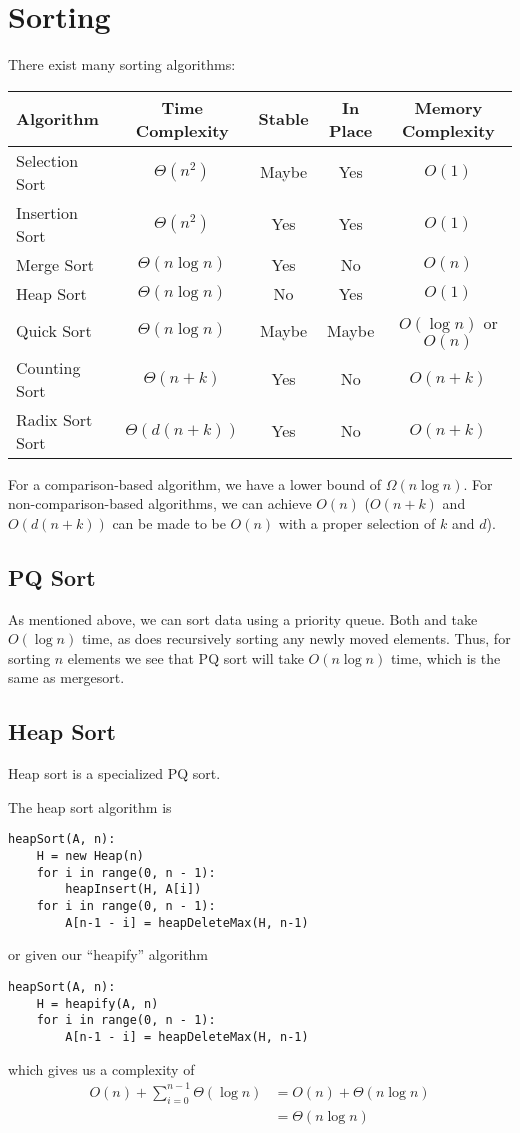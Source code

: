 \documentclass[12pt]{article}
\begin{document}
\section{Sorting}
There exist many sorting algorithms:
\begin{table}[ht]
\centering
  \begin{tabular}{|l|c|c|c|c|}
  \hline
  Algorithm & Time Complexity & Stable & In Place & Memory Complexity \\
  \hline
  \hline
  Selection Sort & $\Theta(n^2)$ & Maybe & Yes & $O(1)$ \\
  Insertion Sort & $\Theta(n^2)$ & Yes & Yes & $O(1)$ \\
  Merge Sort & $\Theta(n\log n)$ & Yes & No & $O(n)$ \\
  Heap Sort & $\Theta(n\log n)$ & No & Yes & $O(1)$ \\
  Quick Sort & $\Theta(n\log n)$ & Maybe & Maybe & $O(\log n)$ or $O(n)$ \\
  Counting Sort & $\Theta(n+k)$ & Yes & No & $O(n+k)$ \\
  Radix Sort Sort & $\Theta(d(n+k))$ & Yes & No & $O(n+k)$ \\
  \hline
  \end{tabular}
\end{table}

For a comparison-based algorithm, we have a lower bound of $\Omega(n\log n)$. For non-comparison-based algorithms, we can achieve $O(n)$ ($O(n+k)$ and $O(d(n+k))$ can be made to be $O(n)$ with a proper selection of $k$ and $d$).

\subsection{PQ Sort}
As mentioned above, we can sort data using a priority queue. Both  and  take $O(\log n)$ time, as does recursively sorting any newly moved elements. Thus, for sorting $n$ elements we see that PQ sort will take $O(n\log n)$ time, which is the same as mergesort.

\subsection{Heap Sort}
Heap sort is a specialized PQ sort.

The heap sort algorithm is
\begin{verbatim}
heapSort(A, n):
    H = new Heap(n)
    for i in range(0, n - 1):
        heapInsert(H, A[i])
    for i in range(0, n - 1):
        A[n-1 - i] = heapDeleteMax(H, n-1)
\end{verbatim}
or given our ``heapify'' algorithm
\begin{verbatim}
heapSort(A, n):
    H = heapify(A, n)
    for i in range(0, n - 1):
        A[n-1 - i] = heapDeleteMax(H, n-1)
\end{verbatim}
which gives us a complexity of
\begin{align*}
O(n) + \sum_{i=0}^{n-1} \Theta(\log n) &= O(n) + \Theta(n\log n)\\
&= \Theta(n\log n)
\end{align*}
\end{document}
